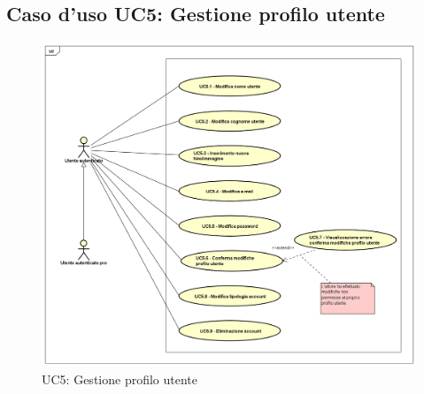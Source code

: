 \newpage
\subsection{Caso d'uso UC5: Gestione profilo utente}

\label{UC5}
\begin{figure}[h]
	\centering
	\includegraphics[scale=0.5,keepaspectratio]{UML/UC5.png}
	\caption{UC5: Gestione profilo utente}
\end{figure}
\FloatBarrier
